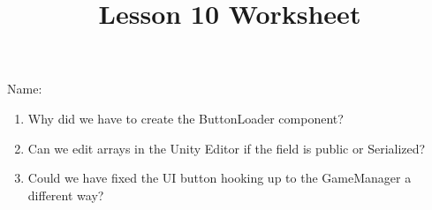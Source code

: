\documentclass[12pt]{../rhitcsse}
\title{Lesson 10 Worksheet}
\begin{document}
\maketitle

\vspace*{0.15in}\hspace{0.25in}Name:\hrulefill\hspace{0.25in}\hspace{0.25in}

\begin{enumerate}
  \item Why did we have to create the ButtonLoader component?
  \vfill
  \item Can we edit arrays in the Unity Editor if the field is public or Serialized?
  \vfill
  \item Could we have fixed the UI button hooking up to the GameManager a different way?
  \vfill

\end{enumerate}
\end{document}
